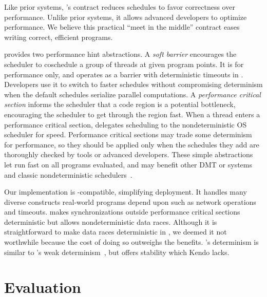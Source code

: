 Like prior systems, \parrot's contract reduces schedules to favor correctness 
over performance.  Unlike prior systems, it allows advanced developers
to optimize performance.  We believe this practical ``meet in the
middle'' contract eases writing correct, efficient programs.



\parrot provides two performance hint abstractions.  A \emph{soft
  barrier} encourages the scheduler to coschedule a group of threads at
given program points.  It is for performance only, and operates as a
barrier with deterministic timeouts in \parrot.  Developers use it to switch
to faster schedules without compromising determinism
when the default schedules serialize parallel
computations.  A \emph{performance critical section}
informs the scheduler that a code region is a potential
bottleneck, encouraging the scheduler to get through the region fast.
When a thread enters a performance critical section, \parrot delegates 
scheduling to the
nondeterministic OS scheduler for speed.  
Performance critical sections may trade some determinism for
performance, so they should be applied only when the schedules they add
are thoroughly checked by tools or advanced developers.
These simple abstractions
let \parrot run fast on all programs evaluated, and
may benefit other DMT or \smt systems and classic nondeterministic
schedulers~\cite{coschedule:sigmetrics96, coschedule, partial-barrier:atc06}.

Our \parrot implementation is \pthread-compatible, simplifying deployment.
It handles many diverse constructs real-world programs depend upon such as
network operations and timeouts.  \parrot makes synchronizations outside
performance critical sections deterministic but allows nondeterministic
data races.  Although it is
straightforward to make data races deterministic in \parrot,
we deemed it not worthwhile because the cost of doing so outweighs the
benefits.  \parrot's determinism is similar to
\kendo's weak determinism~\cite{kendo:asplos09}, but \parrot offers stability
which Kendo lacks.

\section{Evaluation} \label{sec:parrot-eval}

